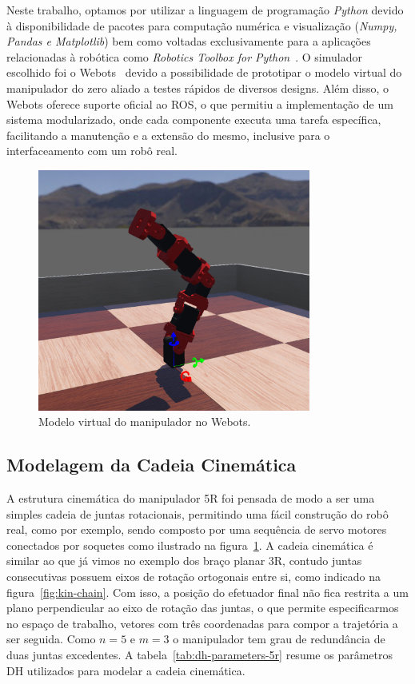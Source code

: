 Neste trabalho, optamos por utilizar a linguagem de programação \emph{Python}
devido à disponibilidade de pacotes para computação numérica e visualização
(\emph{Numpy, Pandas e Matplotlib}) bem como voltadas exclusivamente para a
aplicações relacionadas à robótica como \emph{Robotics Toolbox for
    Python}~\cite{rtb}. O simulador escolhido foi o Webots~\cite{webots} devido a
possibilidade de prototipar o modelo virtual do manipulador do zero aliado a
testes rápidos de diversos designs. Além disso, o Webots oferece suporte
oficial ao ROS, o que permitiu a implementação de um sistema modularizado, onde
cada componente executa uma tarefa específica, facilitando a manutenção e a
extensão do mesmo, inclusive para o interfaceamento com um robô real.

\begin{figure}
    \centering
    \includegraphics[width=0.8\textwidth]{./Images/webots-robot.png}
    \caption{Modelo virtual do manipulador no Webots.}\label{fig:robot-model}
\end{figure}

\subsection*{Modelagem da Cadeia Cinemática}

A estrutura cinemática do manipulador 5R foi pensada de modo a ser uma simples
cadeia de juntas rotacionais, permitindo uma fácil construção do robô real,
como por exemplo, sendo composto por uma sequência de servo motores conectados
por soquetes como ilustrado na figura~\ref{fig:robot-model}. A cadeia
cinemática é similar ao que já vimos no exemplo dos braço planar 3R, contudo
juntas consecutivas possuem eixos de rotação ortogonais entre si, como indicado na
figura~\ref{fig:kin-chain}. Com isso, a posição do efetuador final não fica 
restrita a um plano perpendicular ao eixo de rotação das juntas, o que permite 
especificarmos no espaço de trabalho,
vetores com três coordenadas para compor a trajetória a ser seguida. Como \(n =
5 \text{ e } m = 3\) o manipulador tem grau de redundância de duas juntas
excedentes. A tabela~\ref{tab:dh-parameters-5r} resume os parâmetros DH
utilizados para modelar a cadeia cinemática.

